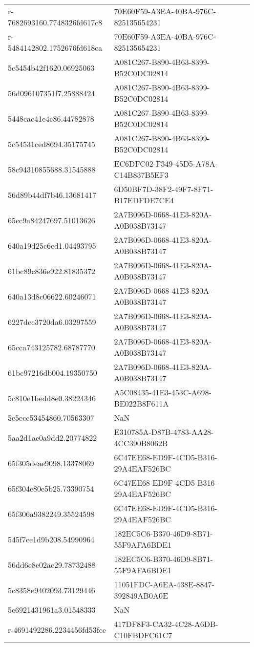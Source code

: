 \begin{tabular}{ll}
r-7682693160.7748326fd617c8 & 70E60F59-A3EA-40BA-976C-825135654231 \\
r-5484142802.1752676fd618ea & 70E60F59-A3EA-40BA-976C-825135654231 \\
5c5454b42f1620.06925063 & A081C267-B890-4B63-8399-B52C0DC02814 \\
56d096107351f7.25888424 & A081C267-B890-4B63-8399-B52C0DC02814 \\
5448cac41e4c86.44782878 & A081C267-B890-4B63-8399-B52C0DC02814 \\
5c54531ced8694.35175745 & A081C267-B890-4B63-8399-B52C0DC02814 \\
58c94310855688.31545888 & EC6DFC02-F349-45D5-A78A-C14B837B5EF3 \\
56d89b44df7b46.13681417 & 6D50BF7D-38F2-49F7-8F71-B17EDFDE7CE4 \\
65cc9a84247697.51013626 & 2A7B096D-0668-41E3-820A-A0B038B73147 \\
640a19d25c6cd1.04493795 & 2A7B096D-0668-41E3-820A-A0B038B73147 \\
61bc89c836e922.81835372 & 2A7B096D-0668-41E3-820A-A0B038B73147 \\
640a13d8c06622.60246071 & 2A7B096D-0668-41E3-820A-A0B038B73147 \\
6227dcc3720da6.03297559 & 2A7B096D-0668-41E3-820A-A0B038B73147 \\
65cca743125782.68787770 & 2A7B096D-0668-41E3-820A-A0B038B73147 \\
61bc97216db004.19350750 & 2A7B096D-0668-41E3-820A-A0B038B73147 \\
5c810e1bedd8e0.38224346 & A5C08435-41E3-453C-A698-BE022B8F611A \\
5e5ecc53454860.70563307 & NaN \\
5aa2d1ae0a9dd2.20774822 & E310785A-D87B-4783-AA28-4CC390B8062B \\
65f305deae9098.13378069 & 6C47EE68-ED9F-4CD5-B316-29A4EAF526BC \\
65f304e80e5b25.73390754 & 6C47EE68-ED9F-4CD5-B316-29A4EAF526BC \\
65f306a9382249.35524598 & 6C47EE68-ED9F-4CD5-B316-29A4EAF526BC \\
545f7ce1d9b208.54990964 & 182EC5C6-B370-46D9-8B71-55F9AFA6BDE1 \\
56dd6e8e02ac29.78732488 & 182EC5C6-B370-46D9-8B71-55F9AFA6BDE1 \\
5c8358e9402093.73129446 & 11051FDC-A6EA-438E-8847-392849AB0A0E \\
5e6921431961a3.01548333 & NaN \\
r-4691492286.2234456fd53fce & 417DF8F3-CA32-4C28-A6DB-C10FBDFC61C7 \\

\end{tabular}
